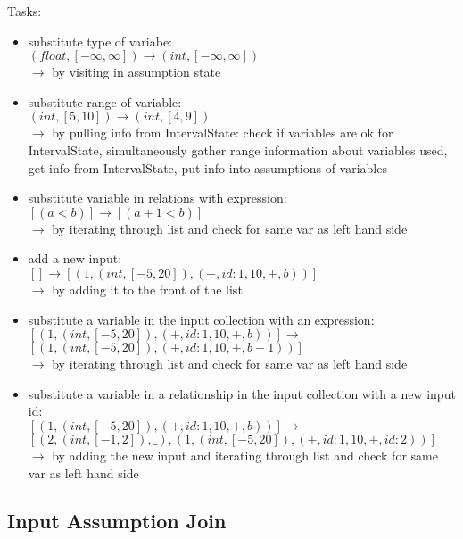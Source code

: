 \documentclass[11pt]{article}
\begin{document}
Tasks:
\begin{itemize}
    \item substitute type of variabe:\\
    $(float, [-\infty, \infty]) \rightarrow (int, [-\infty, \infty])$\\
    $\rightarrow$ by visiting in assumption state
    \item substitute range of variable:\\
    $(int, [5, 10]) \rightarrow (int, [4, 9])$\\
    $\rightarrow$ by pulling info from IntervalState: check if variables are ok for IntervalState, simultaneously gather range information about variables used, get info from IntervalState, put info into assumptions of variables
    \item substitute variable in relations with expression:\\
    $[(a < b)] \rightarrow [(a + 1 < b)]$\\
    $\rightarrow$ by iterating through list and check for same var as left hand side
    \item add a new input:\\
    $[] \rightarrow [(1, (int, [-5, 20]), (+, id{:}1, 10, +, b))]$\\
    $\rightarrow$ by adding it to the front of the list
    \item substitute a variable in the input collection with an expression:\\
    $[(1, (int, [-5, 20]), (+, id{:}1, 10, +, b))] \rightarrow$\\
    $[(1, (int, [-5, 20]), (+, id{:}1, 10, +, b+1))]$\\
    $\rightarrow$ by iterating through list and check for same var as left hand side
    \item substitute a variable in a relationship in the input collection with a new input id:\\
    $[(1, (int, [-5, 20]), (+, id{:}1, 10, +, b))] \rightarrow$\\
    $[(2, (int, [-1, 2]), \_), (1, (int, [-5, 20]), (+, id{:}1, 10, +, id{:}2))]$\\
    $\rightarrow$ by adding the new input and iterating through list and check for same var as left hand side
\end{itemize}


\subsection{Input Assumption Join}
\end{document}
